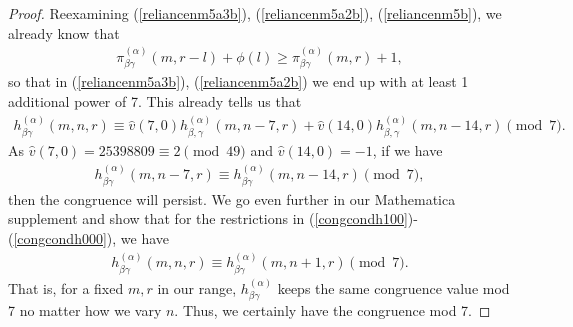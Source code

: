 \documentclass[reqno]{amsart}
\theoremstyle{definition}
\theoremstyle{remark}
\numberwithin{equation}{section}
\begin{document}
\begin{proof}
Reexamining (\ref{reliancenm5a3b}), (\ref{reliancenm5a2b}), (\ref{reliancenm5b}), we already know that 
\begin{align*}
\pi^{(\alpha)}_{\beta\gamma}(m,r-l) + \phi(l) \ge \pi^{(\alpha)}_{\beta\gamma}(m,r) + 1,
\end{align*} so that in (\ref{reliancenm5a3b}), (\ref{reliancenm5a2b}) we end up with at least 1 additional power of 7.  This already tells us that
\begin{align*}
h^{(\alpha)}_{\beta\gamma}(m,n,r)\equiv \hat{v}(7,0) h^{(\alpha)}_{\beta,\gamma}(m,n-7,r)+ \hat{v}(14,0) h^{(\alpha)}_{\beta,\gamma}(m,n-14,r)\pmod{7}.
\end{align*}  As $\hat{v}(7,0)=25398809\equiv 2\pmod{49}$ and $\hat{v}(14,0)=-1$, if we have 
\begin{align*}
h^{(\alpha)}_{\beta\gamma}(m,n-7,r)\equiv h^{(\alpha)}_{\beta\gamma}(m,n-14,r)\pmod{7},
\end{align*} then the congruence will persist.  We go even further in our Mathematica supplement and show that for the restrictions in (\ref{congcondh100})-(\ref{congcondh000}), we have
\begin{align*}
h^{(\alpha)}_{\beta\gamma}(m,n,r)\equiv h^{(\alpha)}_{\beta\gamma}(m,n+1,r)\pmod{7}.
\end{align*}  That is, for a fixed $m,r$ in our range, $h^{(\alpha)}_{\beta\gamma}$ keeps the same congruence value mod 7 no matter how we vary $n$. Thus, we certainly have the congruence mod 7.


\end{proof}
\end{document}
